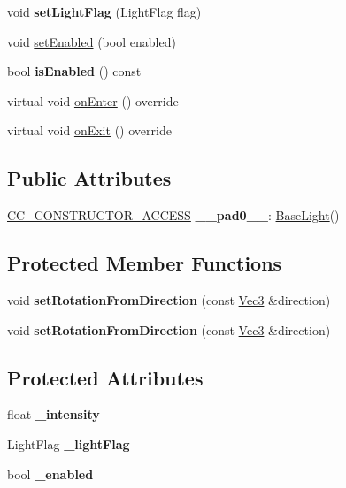 \begin{DoxyCompactItemize}
void {\bfseries set\+Light\+Flag} (Light\+Flag flag)
\item 
void \hyperlink{classBaseLight_af3da106fbf57edbbfc9ca20319311bb6}{set\+Enabled} (bool enabled)
\item 
\mbox{\label{classBaseLight_afd1c35f75803529a0d8bb09b8cd4d1ae}} 
bool {\bfseries is\+Enabled} () const
\item 
virtual void \hyperlink{classBaseLight_ae53451e8579dce26537726a634fc81f5}{on\+Enter} () override
\item 
virtual void \hyperlink{classBaseLight_ab2287f5f40ce71824cfb5577a0874b07}{on\+Exit} () override
\end{DoxyCompactItemize}
\subsection*{Public Attributes}
\begin{DoxyCompactItemize}
\item 
\mbox{\label{classBaseLight_a5de5d1bf86cdfadb2aa58c255efb73bc}} 
\hyperlink{_2cocos2d_2cocos_2base_2ccConfig_8h_a25ef1314f97c35a2ed3d029b0ead6da0}{C\+C\+\_\+\+C\+O\+N\+S\+T\+R\+U\+C\+T\+O\+R\+\_\+\+A\+C\+C\+E\+SS} {\bfseries \+\_\+\+\_\+pad0\+\_\+\+\_\+}\+: \hyperlink{classBaseLight}{Base\+Light}()
\end{DoxyCompactItemize}
\subsection*{Protected Member Functions}
\begin{DoxyCompactItemize}
\item 
\mbox{\label{classBaseLight_a6a2be88fe626a8b73246b97bf62a3401}} 
void {\bfseries set\+Rotation\+From\+Direction} (const \hyperlink{classVec3}{Vec3} \&direction)
\item 
\mbox{\label{classBaseLight_a6a2be88fe626a8b73246b97bf62a3401}} 
void {\bfseries set\+Rotation\+From\+Direction} (const \hyperlink{classVec3}{Vec3} \&direction)
\end{DoxyCompactItemize}
\subsection*{Protected Attributes}
\begin{DoxyCompactItemize}
\item 
\mbox{\label{classBaseLight_ac1bfb1f99e53f37aea945e76d8591e7b}} 
float {\bfseries \+\_\+intensity}
\item 
\mbox{\label{classBaseLight_a897b5e772e0a2eb7a45c4b7e8eab7c69}} 
Light\+Flag {\bfseries \+\_\+light\+Flag}
\item 
\mbox{\label{classBaseLight_ae838f173c14e4fa95d7a776679e275d9}} 
bool {\bfseries \+\_\+enabled}
\end{DoxyCompactItemize}

